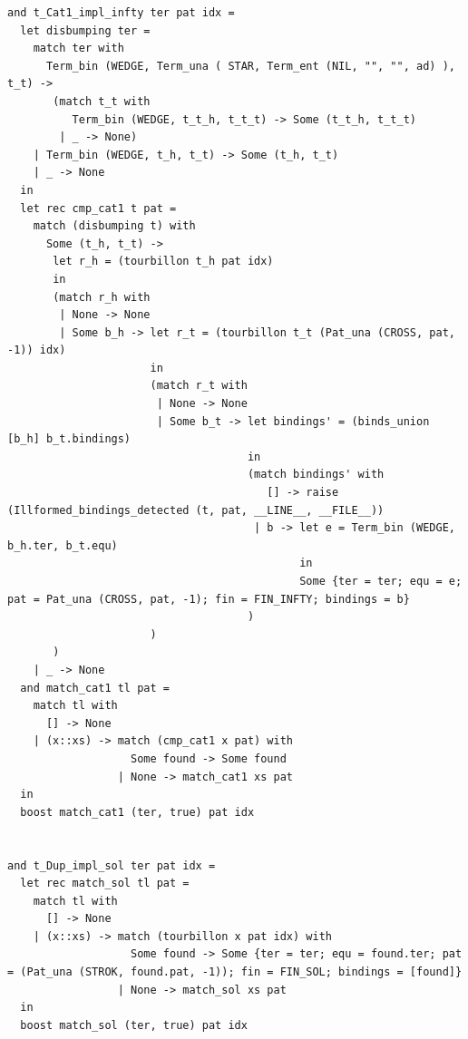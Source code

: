 \documentclass[12pt]{article}
\begin{document}
\begin{tiny}
\begin{verbatim}
and t_Cat1_impl_infty ter pat idx =
  let disbumping ter =
    match ter with
      Term_bin (WEDGE, Term_una ( STAR, Term_ent (NIL, "", "", ad) ), t_t) ->
       (match t_t with
          Term_bin (WEDGE, t_t_h, t_t_t) -> Some (t_t_h, t_t_t)
        | _ -> None)
    | Term_bin (WEDGE, t_h, t_t) -> Some (t_h, t_t)
    | _ -> None
  in
  let rec cmp_cat1 t pat =
    match (disbumping t) with
      Some (t_h, t_t) ->
       let r_h = (tourbillon t_h pat idx)
       in
       (match r_h with
        | None -> None
        | Some b_h -> let r_t = (tourbillon t_t (Pat_una (CROSS, pat, -1)) idx)
                      in
                      (match r_t with
                       | None -> None
                       | Some b_t -> let bindings' = (binds_union [b_h] b_t.bindings)
                                     in
                                     (match bindings' with
                                        [] -> raise (Illformed_bindings_detected (t, pat, __LINE__, __FILE__))
                                      | b -> let e = Term_bin (WEDGE, b_h.ter, b_t.equ)
                                             in
                                             Some {ter = ter; equ = e; pat = Pat_una (CROSS, pat, -1); fin = FIN_INFTY; bindings = b}
                                     )
                      )
       )
    | _ -> None
  and match_cat1 tl pat =
    match tl with
      [] -> None
    | (x::xs) -> match (cmp_cat1 x pat) with
                   Some found -> Some found
                 | None -> match_cat1 xs pat
  in
  boost match_cat1 (ter, true) pat idx


and t_Dup_impl_sol ter pat idx =
  let rec match_sol tl pat =
    match tl with
      [] -> None
    | (x::xs) -> match (tourbillon x pat idx) with
                   Some found -> Some {ter = ter; equ = found.ter; pat = (Pat_una (STROK, found.pat, -1)); fin = FIN_SOL; bindings = [found]}
                 | None -> match_sol xs pat
  in
  boost match_sol (ter, true) pat idx



\end{verbatim}
\end{tiny}
\end{document}
